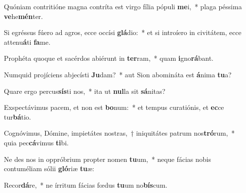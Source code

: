 \item Quóniam contritióne magna contríta est virgo fília pópuli \textbf{me}i,~* plaga péssima \textbf{ve}he\textbf{mén}ter.
\item Si egréssus fúero ad agros, ecce occísi \textbf{glá}dio:~* et si introíero in civitátem, ecce attenu\textbf{á}ti \textbf{fa}me.
\item Prophéta quoque et sacérdos abiérunt in \textbf{ter}ram,~* quam \textbf{i}gno\textbf{rá}bant.
\item Numquid projíciens abjecísti \textbf{Ju}dam?~* aut Sion abomináta est \textbf{á}nima \textbf{tu}a?
\item Quare ergo percus\textbf{sís}ti nos,~* ita ut \textbf{nul}la sit \textbf{sá}nitas?
\item Exspectávimus pacem, et non est \textbf{bo}num:~* et tempus curatiónis, et \textbf{ec}ce tur\textbf{bá}tio.
\item Cognóvimus, Dómine, impietátes nostras,~† iniquitátes patrum nos\textbf{tró}rum,~* quia pec\textbf{cá}vimus \textbf{ti}bi.
\item Ne des nos in oppróbrium propter nomen \textbf{tu}um,~* neque fácias nobis contuméliam sólii \textbf{gló}riæ \textbf{tu}æ:
\item Recor\textbf{dá}re,~* ne írritum fácias fœdus \textbf{tu}um no\textbf{bís}cum.
